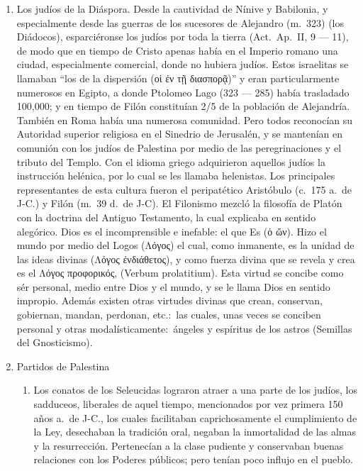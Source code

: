\raggedbottom{} \documentclass[12pt, a4paper, openany]{book} %
\begin{document}
\begin{enumerate}
  \item Los judíos de la Diáspora. Desde la cautividad de Nínive y Babilonia, y especialmente desde las guerras de los sucesores de Alejandro (m.\ 323) (los Diádocos), esparciéronse los judíos por toda la tierra (Act.\ Ap.\ II, 9 --- 11), de modo que en tiempo de Cristo apenas había en el Imperio romano una ciudad, especialmente comercial, donde no hubiera judíos. Estos israelitas se llamaban ``los de la dispersión (\textgreek{οἱ ἐν τῇ διασπορᾷ})'' y eran particularmente numerosos en Egipto, a donde Ptolomeo Lago (323 --- 285) había trasladado 100,000; y en tiempo de Filón constituían 2/5 de la población de Alejandría. También en Roma había una numerosa comunidad. Pero todos reconocían su Autoridad superior religiosa en el Sinedrio de Jerusalén, y se mantenían en comunión con los judíos de Palestina por medio de las peregrinaciones y el tributo del Templo. Con el idioma griego adquirieron aquellos judíos la instrucción helénica, por lo cual se les llamaba helenistas. Los principales representantes de esta cultura fueron el peripatético Aristóbulo (c.\ 175 a.\ de J-C.) y Filón (m.\ 39 d.\ de J-C). El Filonismo mezcló la filosofía de Platón con la doctrina del Antiguo Testamento, la cual explicaba en sentido alegórico. Dios es el incomprensible e inefable: el que Es (\textgreek{ὁ ὤν}). Hizo el mundo por medio del Logos (\textgreek{Λόγος}) el cual, como inmanente, es la unidad de las ideas divinas (\textgreek{Λόγος ἐνδιάθετος}), y como fuerza divina que se revela y crea es el \textgreek{Λόγος προφορικός}, (Verbum prolatitium). Esta virtud se concibe como sér personal, medio entre Dios y el mundo, y se le llama Dios en sentido impropio. Además existen otras virtudes divinas que crean, conservan, gobiernan, mandan, perdonan, etc.:\ las cuales, unas veces se conciben personal y otras modalísticamente:\ ángeles y espíritus de los astros (Semillas del Gnosticismo).
  \item Partidos de Palestina \begin{enumerate}
          \item Los conatos de los Seleucidas lograron atraer a una parte de los judíos, los sadduceos, liberales de aquel tiempo, mencionados por vez primera 150 años a.\ de J-C., los cuales facilitaban caprichosamente el cumplimiento de la Ley, desechaban la tradición oral, negaban la inmortalidad de las almas y la resurrección. Pertenecían a la clase pudiente y conservaban buenas relaciones con los Poderes públicos; pero tenían poco influjo en el pueblo.

\end{enumerate}
\end{enumerate}
\end{document}
